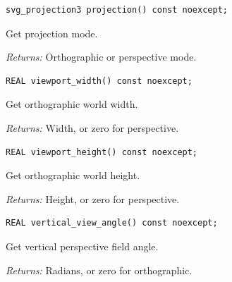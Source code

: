 \par\noindent\begin{minipage}{\linewidth}
\begin{lstlisting}[style=apireference]
svg_projection3 projection() const noexcept;
\end{lstlisting}
{\footnotesize Get projection mode.\par}
{\footnotesize\textit{Returns:} Orthographic or perspective mode.\par}
\end{minipage}\par\vspace{1pt}
\par\noindent\begin{minipage}{\linewidth}
\begin{lstlisting}[style=apireference]
REAL viewport_width() const noexcept;
\end{lstlisting}
{\footnotesize Get orthographic world width.\par}
{\footnotesize\textit{Returns:} Width, or zero for perspective.\par}
\end{minipage}\par\vspace{1pt}
\par\noindent\begin{minipage}{\linewidth}
\begin{lstlisting}[style=apireference]
REAL viewport_height() const noexcept;
\end{lstlisting}
{\footnotesize Get orthographic world height.\par}
{\footnotesize\textit{Returns:} Height, or zero for perspective.\par}
\end{minipage}\par\vspace{1pt}
\par\noindent\begin{minipage}{\linewidth}
\begin{lstlisting}[style=apireference]
REAL vertical_view_angle() const noexcept;
\end{lstlisting}
{\footnotesize Get vertical perspective field angle.\par}
{\footnotesize\textit{Returns:} Radians, or zero for orthographic.\par}
\end{minipage}\par\vspace{1pt}
